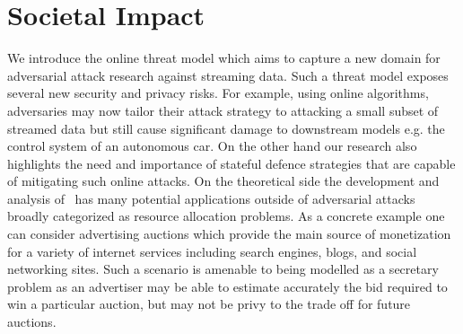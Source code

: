 \section*{Societal Impact}
\label{broader_impact}
We introduce the online threat model which aims to capture a new domain for adversarial attack research against streaming data. Such a threat model exposes several new security and privacy risks. For example, using online algorithms, adversaries may now tailor their attack strategy to attacking a small subset of streamed data but still cause significant damage to downstream models e.g. the control system of an autonomous car. On the other hand our research also highlights the need and importance of stateful defence strategies that are capable of mitigating such online attacks. On the theoretical side the development and analysis of \algoname \ has many potential applications outside of adversarial attacks broadly categorized as resource allocation problems. As a concrete example one can consider advertising auctions which provide the main source of monetization for a variety of internet services including search engines, blogs, and social networking sites. Such a scenario is amenable to being modelled as a secretary problem as an advertiser may be able to estimate accurately the bid required to win a particular auction, but may not be privy to the trade off for future auctions.

